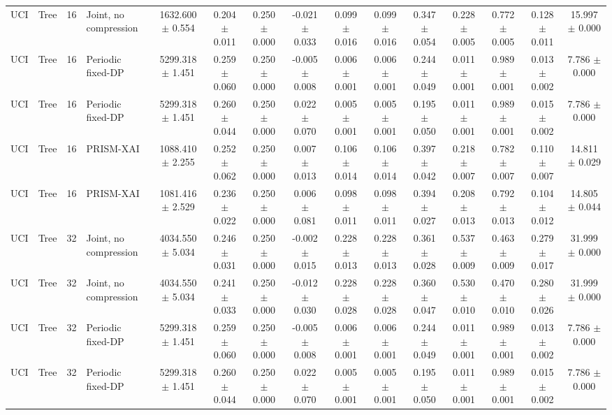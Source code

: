 \begin{table}[t]
\begin{tabular}{llllccccccccccc}
UCI & Tree & 16 & Joint, no compression & 1632.600 $\pm$ 0.554 & 0.204 $\pm$ 0.011 & 0.250 $\pm$ 0.000 & -0.021 $\pm$ 0.033 & 0.099 $\pm$ 0.016 & 0.099 $\pm$ 0.016 & 0.347 $\pm$ 0.054 & 0.228 $\pm$ 0.005 & 0.772 $\pm$ 0.005 & 0.128 $\pm$ 0.011 & 15.997 $\pm$ 0.000 \\
UCI & Tree & 16 & Periodic fixed-DP & 5299.318 $\pm$ 1.451 & 0.259 $\pm$ 0.060 & 0.250 $\pm$ 0.000 & -0.005 $\pm$ 0.008 & 0.006 $\pm$ 0.001 & 0.006 $\pm$ 0.001 & 0.244 $\pm$ 0.049 & 0.011 $\pm$ 0.001 & 0.989 $\pm$ 0.001 & 0.013 $\pm$ 0.002 & 7.786 $\pm$ 0.000 \\
UCI & Tree & 16 & Periodic fixed-DP & 5299.318 $\pm$ 1.451 & 0.260 $\pm$ 0.044 & 0.250 $\pm$ 0.000 & 0.022 $\pm$ 0.070 & 0.005 $\pm$ 0.001 & 0.005 $\pm$ 0.001 & 0.195 $\pm$ 0.050 & 0.011 $\pm$ 0.001 & 0.989 $\pm$ 0.001 & 0.015 $\pm$ 0.002 & 7.786 $\pm$ 0.000 \\
UCI & Tree & 16 & PRISM-XAI & 1088.410 $\pm$ 2.255 & 0.252 $\pm$ 0.062 & 0.250 $\pm$ 0.000 & 0.007 $\pm$ 0.013 & 0.106 $\pm$ 0.014 & 0.106 $\pm$ 0.014 & 0.397 $\pm$ 0.042 & 0.218 $\pm$ 0.007 & 0.782 $\pm$ 0.007 & 0.110 $\pm$ 0.007 & 14.811 $\pm$ 0.029 \\
UCI & Tree & 16 & PRISM-XAI & 1081.416 $\pm$ 2.529 & 0.236 $\pm$ 0.022 & 0.250 $\pm$ 0.000 & 0.006 $\pm$ 0.081 & 0.098 $\pm$ 0.011 & 0.098 $\pm$ 0.011 & 0.394 $\pm$ 0.027 & 0.208 $\pm$ 0.013 & 0.792 $\pm$ 0.013 & 0.104 $\pm$ 0.012 & 14.805 $\pm$ 0.044 \\
UCI & Tree & 32 & Joint, no compression & 4034.550 $\pm$ 5.034 & 0.246 $\pm$ 0.031 & 0.250 $\pm$ 0.000 & -0.002 $\pm$ 0.015 & 0.228 $\pm$ 0.013 & 0.228 $\pm$ 0.013 & 0.361 $\pm$ 0.028 & 0.537 $\pm$ 0.009 & 0.463 $\pm$ 0.009 & 0.279 $\pm$ 0.017 & 31.999 $\pm$ 0.000 \\
UCI & Tree & 32 & Joint, no compression & 4034.550 $\pm$ 5.034 & 0.241 $\pm$ 0.033 & 0.250 $\pm$ 0.000 & -0.012 $\pm$ 0.030 & 0.228 $\pm$ 0.028 & 0.228 $\pm$ 0.028 & 0.360 $\pm$ 0.047 & 0.530 $\pm$ 0.010 & 0.470 $\pm$ 0.010 & 0.280 $\pm$ 0.026 & 31.999 $\pm$ 0.000 \\
UCI & Tree & 32 & Periodic fixed-DP & 5299.318 $\pm$ 1.451 & 0.259 $\pm$ 0.060 & 0.250 $\pm$ 0.000 & -0.005 $\pm$ 0.008 & 0.006 $\pm$ 0.001 & 0.006 $\pm$ 0.001 & 0.244 $\pm$ 0.049 & 0.011 $\pm$ 0.001 & 0.989 $\pm$ 0.001 & 0.013 $\pm$ 0.002 & 7.786 $\pm$ 0.000 \\
UCI & Tree & 32 & Periodic fixed-DP & 5299.318 $\pm$ 1.451 & 0.260 $\pm$ 0.044 & 0.250 $\pm$ 0.000 & 0.022 $\pm$ 0.070 & 0.005 $\pm$ 0.001 & 0.005 $\pm$ 0.001 & 0.195 $\pm$ 0.050 & 0.011 $\pm$ 0.001 & 0.989 $\pm$ 0.001 & 0.015 $\pm$ 0.002 & 7.786 $\pm$ 0.000 \\

\end{tabular}
\end{table}

